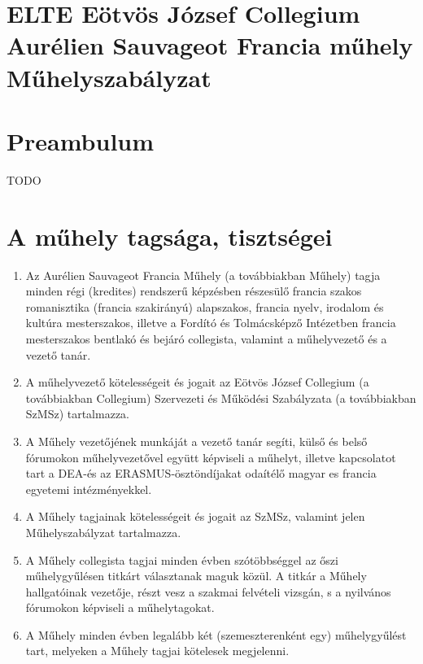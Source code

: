 \documentclass{../styles/rulebook}
\begin{document}
\section*{ELTE Eötvös József Collegium \\ Aurélien Sauvageot Francia műhely\\ \vspace{0.5em} Műhelyszabályzat} 

\vspace{2em}

\section*{Preambulum}
TODO


\section{A műhely tagsága, tisztségei}

\begin{enumerate}
	\item Az Aurélien Sauvageot Francia Műhely (a továbbiakban Műhely) tagja minden régi (kredites) rendszerű képzésben részesülő francia szakos romanisztika (francia szakirányú) alapszakos, francia nyelv, irodalom és kultúra mesterszakos, illetve a Fordító és Tolmácsképző Intézetben francia mesterszakos bentlakó és bejáró collegista, valamint a műhelyvezető és a vezető tanár.
	\item A műhelyvezető kötelességeit és jogait az Eötvös József Collegium (a továbbiakban Collegium) Szervezeti és Működési Szabályzata (a továbbiakban SzMSz) tartalmazza.
	\item A Műhely vezetőjének munkáját a vezető tanár segíti, külső és belső fórumokon műhelyvezetővel együtt képviseli a műhelyt, illetve kapcsolatot tart a DEA-és az ERASMUS-ösztöndíjakat odaítélő magyar es francia egyetemi intézményekkel.
	\item A Műhely tagjainak kötelességeit és jogait az SzMSz, valamint jelen Műhelyszabályzat tartalmazza.
	\item A Műhely collegista tagjai minden évben szótöbbséggel az őszi műhelygyűlésen titkárt választanak maguk közül. A titkár a Műhely hallgatóinak vezetője, részt vesz a szakmai felvételi vizsgán, s a nyilvános fórumokon képviseli a műhelytagokat.
	\item A Műhely minden évben legalább két (szemeszterenként egy) műhelygyűlést tart, melyeken a Műhely tagjai kötelesek megjelenni.
\end{enumerate}
\end{document}
